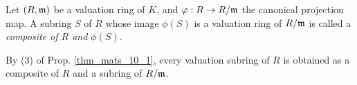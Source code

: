 \begin{defn}
Let $(R, \mathfrak{m})$ be a valuation ring of $K$, and $\varphi: R \to 
R/\mathfrak{m}$ the canonical projection map. A subring $S$ of $R$ whose
image $\phi(S)$ is a valuation ring of $R/\mathfrak{m}$ is called a
\emph{composite of $R$ and $\phi(S)$}.
\end{defn}

\begin{rmk}
By (3) of Prop. \ref{thm_mats_10_1}, every valuation subring of
$R$ is obtained as a composite of $R$ and a subring of 
$R/\mathfrak{m}$. 
\end{rmk}

